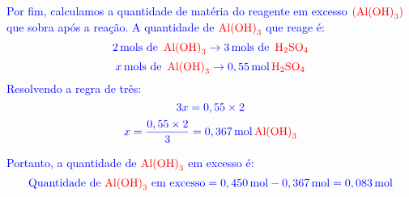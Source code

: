 \documentclass[a4paper, 12pt]{article}
\begin{document}
\begin{enumerate}
          \textcolor{blue}{Por fim, calculamos a quantidade de matéria do reagente em excesso \(\textcolor{red}{(\text{Al(OH)}_{3})}\) que sobra após a reação. A quantidade de \(\textcolor{red}{\text{Al(OH)}_{3}}\) que reage é:}
          \[
              \textcolor{blue}{2 \, \text{mols de } \, \textcolor{red}{\text{Al(OH)}_{3}} \rightarrow 3 \, \text{mols de } \, \textcolor{red}{\text{H}_{2}\text{SO}_{4}}}
          \]
          \[
              \textcolor{blue}{x \, \text{mols de } \, \textcolor{red}{\text{Al(OH)}_{3}} \rightarrow 0,55 \, \text{mol} \, \textcolor{red}{\text{H}_{2}\text{SO}_{4}}}
          \]
          \textcolor{blue}{Resolvendo a regra de três:}
          \[
              \textcolor{blue}{3x = 0,55 \times 2}
          \]
          \[
              \textcolor{blue}{x = \frac{0,55 \times 2}{3} = 0,367 \, \text{mol} \, \textcolor{red}{\text{Al(OH)}_{3}}}
          \]

          \textcolor{blue}{Portanto, a quantidade de \(\textcolor{red}{\text{Al(OH)}_{3}}\) em excesso é:}
          \[
              \textcolor{blue}{\text{Quantidade de } \textcolor{red}{\text{Al(OH)}_{3}} \text{ em excesso} = 0,450 \, \text{mol} - 0,367 \, \text{mol} = 0,083 \, \text{mol}}
          \]



\end{enumerate}
\end{document}
